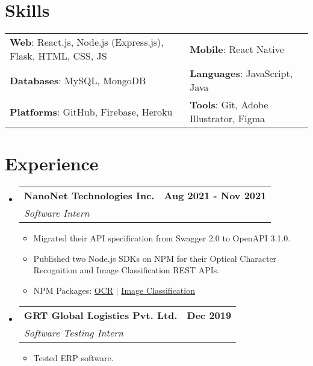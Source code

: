 \documentclass[letterpaper,11pt]{article}
\makeatletter
\newcommand{\resumeItem}[1]{
  \item\small{
    {#1 \vspace{-2pt}}
  }
}
\newcommand{\resumeSubheading}[4]{
  \vspace{-2pt}\item
    \begin{tabular*}{1.0\textwidth}[t]{l@{\extracolsep{\fill}}r}
      \vspace{-2pt}\textbf{#1} & \textbf{\small #2} \\
      \textit{\small#3} & \textit{\small #4} \\
    \end{tabular*}\vspace{-7pt}
}
\newcommand{\resumeSubHeadingListStart}{\begin{itemize}[leftmargin=0.0in, label={}]}
\newcommand{\resumeSubHeadingListEnd}{\end{itemize}}
\newcommand{\resumeItemListStart}{\begin{itemize}}
\newcommand{\resumeItemListEnd}{\end{itemize}\vspace{-5pt}}
\makeatother
\begin{document}
\section{Skills}
    \vspace{-2pt}
    \begin{itemize}[leftmargin=0.2in, label={}]
        {\item{
            \begin{tabular}{ l@{\hskip 0.2in} l }
                 \textbf{Web}: React.js, Node.js (Express.js), Flask, HTML, CSS, JS & \textbf{Mobile}: React Native \\ 
                 \textbf{Databases}: MySQL, MongoDB & \textbf{Languages}: JavaScript, Java \\  
                 \textbf{Platforms}: GitHub, Firebase, Heroku & \textbf{Tools}: Git, Adobe Illustrator, Figma    
            \end{tabular}
        }}
    \end{itemize}
\vspace{-22pt}


\section{Experience}
    \resumeSubHeadingListStart
        \resumeSubheading
            {NanoNet Technologies Inc.}{Aug 2021 - Nov 2021}
            {Software Intern}{}
            \resumeItemListStart
                \resumeItem{Migrated their API specification from Swagger 2.0 to OpenAPI 3.1.0.}
                \resumeItem{Published two Node.js SDKs on NPM for their Optical Character Recognition and Image Classification REST APIs.}
                \resumeItem{NPM Packages: \href{https://www.npmjs.com/package/@nanonets/optical-character-recognition}{OCR} $|$  \href{https://www.npmjs.com/package/@nanonets/image-classification}{Image Classification}}
            \resumeItemListEnd

        \resumeSubheading
            {GRT Global Logistics Pvt. Ltd.}{Dec 2019}
            {Software Testing Intern}{}
            \resumeItemListStart
                \resumeItem{Tested ERP software.}
            \resumeItemListEnd
    \resumeSubHeadingListEnd
\vspace{-19pt}


\end{document}
